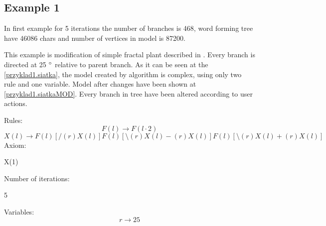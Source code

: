 \documentclass[b5paper,twoside,11pt]{article}
\begin{document}
\subsection*{Example 1}
In first example for 5 iterations the number of branches is 468, word forming tree have 46086 chars and number of vertices in model is 87200.\par
This example is modification of simple fractal plant described in \cite{prusinABOP}.
Every branch is directed at 25  $\degree$ relative to parent branch. As it can be seen at the \figurename \ref{przyklad1.siatka}, the model created by algorithm is complex, using only two rule and one variable. Model after changes have been shown at  \figurename \ref{przyklad1.siatkaMOD}. Every branch in tree have been altered according to user actions.\par 
Rules: \newline
\begin{equation*}
F(l)\rightarrow F(l\cdot2) 
\end{equation*}
\begin{equation*}
X(l) \rightarrow F(l)[/(r)X(l)]F(l)[\setminus(r)X(l)-(r)X(l)]F(l)[\setminus(r)X(l)+(r)X(l)] 
\end{equation*}
Axiom:
\begin{center}
X(1)
\end{center}
Number of iterations:
\begin{center}
5
\end{center}
Variables:
\begin{equation*}
r\rightarrow 25
\end{equation*}
\end{document}
